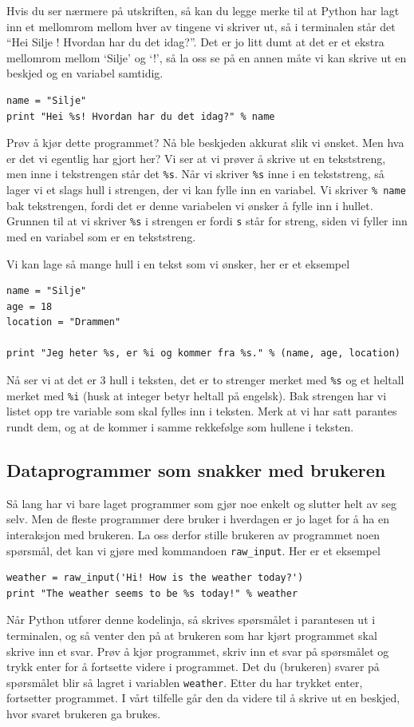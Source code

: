 \documentclass[a4paper, 11pt, notitlepage]{article}
\begin{document}
Hvis du ser nærmere på utskriften, så kan du legge merke til at Python har lagt inn et mellomrom mellom hver av tingene vi skriver ut, så i terminalen står det 
``Hei Silje ! Hvordan har du det idag?''. Det er jo litt dumt at det er et ekstra mellomrom mellom `Silje' og `!', så la oss se på en annen måte vi kan skrive ut en beskjed og en variabel samtidig.
\begin{lstlisting}
name = "Silje"
print "Hei %s! Hvordan har du det idag?" % name
\end{lstlisting}
Prøv å kjør dette programmet? Nå ble beskjeden akkurat slik vi ønsket. Men hva er det vi egentlig har gjort her? Vi ser at vi prøver å skrive ut en tekststreng, men inne i tekstrengen står det \verb+%s+. Når vi skriver \verb+%s+ inne i en tekststreng, så lager vi et slags hull i strengen, der vi kan fylle inn en variabel. Vi skriver \verb+% name+ bak tekstrengen, fordi det er denne variabelen vi ønsker å fylle inn i hullet. Grunnen til at vi skriver \verb+%s+ i strengen er fordi \verb+s+ står for streng, siden vi fyller inn med en variabel som er en tekststreng.

Vi kan lage så mange hull i en tekst som vi ønsker, her er et eksempel
\begin{lstlisting}
name = "Silje"
age = 18
location = "Drammen"

print "Jeg heter %s, er %i og kommer fra %s." % (name, age, location)
\end{lstlisting}
Nå ser vi at det er 3 hull i teksten, det er to strenger merket med \verb+%s+ og et heltall merket med \verb+%i+ (husk at integer betyr heltall på engelsk). Bak strengen har vi listet opp tre variable som skal fylles inn i teksten. Merk at vi har satt parantes rundt dem, og at de kommer i samme rekkefølge som hullene i teksten.

\subsection*{Dataprogrammer som snakker med brukeren}

Så lang har vi bare laget programmer som gjør noe enkelt og slutter helt av seg selv. Men de fleste programmer dere bruker i hverdagen er jo laget for å ha en interaksjon med brukeren. La oss derfor stille brukeren av programmet noen spørsmål, det kan vi gjøre med kommandoen \verb+raw_input+. Her er et eksempel
\begin{lstlisting}
weather = raw_input('Hi! How is the weather today?')
print "The weather seems to be %s today!" % weather
\end{lstlisting}
Når Python utfører denne kodelinja, så skrives spørsmålet i parantesen ut i terminalen, og så venter den på at brukeren som har kjørt programmet skal skrive inn et svar. Prøv å kjør programmet, skriv inn et svar på spørsmålet og trykk enter for å fortsette videre i programmet. Det du (brukeren) svarer på spørsmålet blir så lagret i variablen \verb+weather+. Etter du har trykket enter, fortsetter programmet. I vårt tilfelle går den da videre til å skrive ut en beskjed, hvor svaret brukeren ga brukes.
\end{document}
